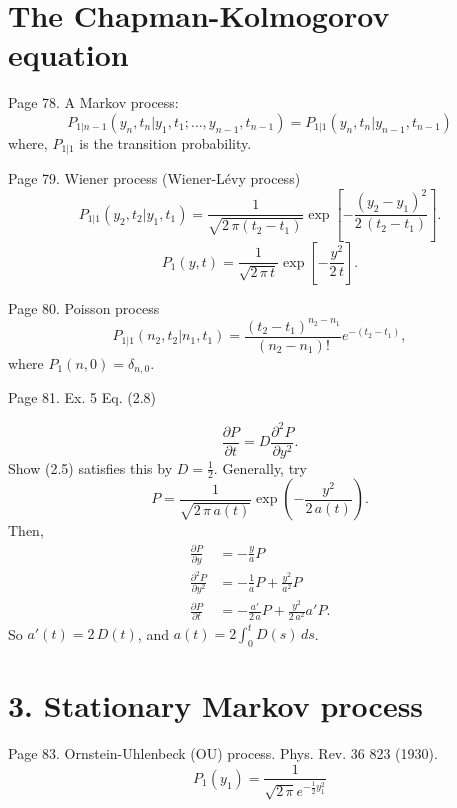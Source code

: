 \documentclass{book}
\theoremstyle{plain}
\theoremstyle{definition}
\theoremstyle{remark}
\begin{document}
\section{The Chapman-Kolmogorov equation}

Page 78.
A Markov process:
$$
P_{1|n-1}(y_n, t_n| y_1, t_1; \dots, y_{n-1}, t_{n-1})
=
P_{1|1}(y_n, t_n|y_{n-1},t_{n-1})
$$
where, $P_{1|1}$ is the transition probability.

Page 79.
Wiener process (Wiener-L\'evy process)
\begin{equation}
P_{1|1}(y_2, t_2|y_1, t_1)
=
\frac{1}{\sqrt{2\,\pi(t_2 - t_1)}}
\exp\left[
  -\frac{ (y_2 - y_1)^2 } { 2 \, (t_2 - t_1) }
\right].
\tag{2.4}
\end{equation}
%
\begin{equation}
P_1(y, t)
=
\frac{1}{\sqrt{2\,\pi\,t}}
\exp\left[
  -\frac{ y^2 } { 2 \, t }
\right].
\tag{2.5}
\end{equation}


Page 80.
Poisson process
\begin{equation}
P_{1|1}(n_2, t_2|n_1, t_1)
=
\frac{ (t_2 - t_1)^{n_2 - n_1} } { (n_2 - n_1)! }
e^{ -(t_2 - t_1) },
\tag{2.6}
\end{equation}
where
$P_1(n, 0) = \delta_{n,0}$.

Page 81. Ex. 5 Eq. (2.8)

$$
\frac{ \partial P } { \partial t }
=
D \frac{ \partial^2 P } { \partial y^2 }.
$$
Show (2.5) satisfies this by $D = \frac{1}{2}$.
Generally, try
$$
P = \frac{ 1 } { \sqrt{ 2 \, \pi \, a(t) } }
\exp\left(
  - \frac{ y^2 } { 2 \, a(t) }
\right).
$$
Then,
$$
\begin{aligned}
\frac{ \partial P } { \partial y }
&=
- \frac{ y } { a } P
\\
\frac{ \partial^2 P } { \partial y^2 }
&=
- \frac{1}{a} P
+ \frac{ y^2 } { a^2 } P
\\
\frac{ \partial P } { \partial t }
&=
-\frac{ a' } { 2 \, a } P
+ \frac{ y^2 } { 2 \, a^2 } a' P.
\end{aligned}
$$
So $a'(t) = 2 \, D(t)$,
and
$a(t) = 2 \int^t_0 D(s) \, ds$.


\section{3. Stationary Markov process}

Page 83.
Ornstein-Uhlenbeck (OU) process.
Phys. Rev. 36 823 (1930).
\begin{equation}
P_1(y_1)
=
\frac{1}{\sqrt{2 \, \pi} e^{-\frac 1 2 y_1^2 } }
\tag{3.10}
\end{equation}
\end{document}
